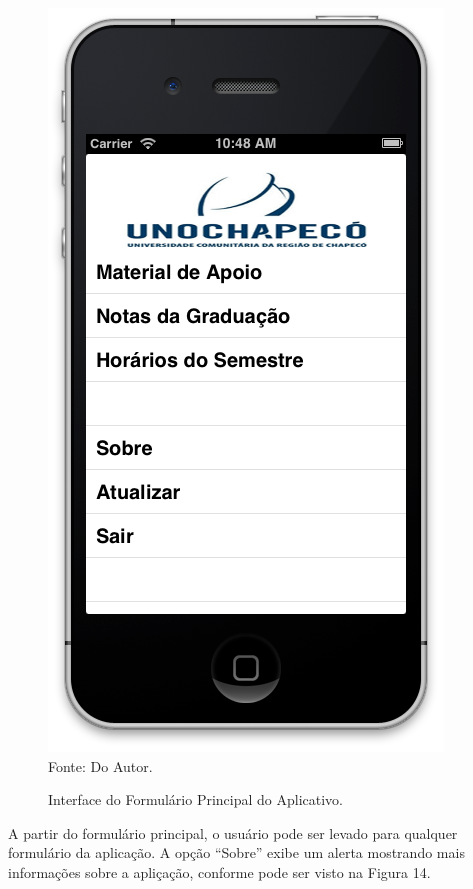 \begin{figure}[!htb]
     \centering
     \caption[Formulário Principal - Interface]{Interface do Formulário Principal do Aplicativo.}
     \includegraphics[scale=0.34]{imagens/formprincipal.png}
     \\  Fonte: Do Autor.
\end{figure}

A partir do formulário principal, o usuário pode ser levado para qualquer formulário da aplicação. A opção ``Sobre'' exibe um alerta mostrando mais informações sobre a apliçação, conforme pode ser visto na Figura 14.

